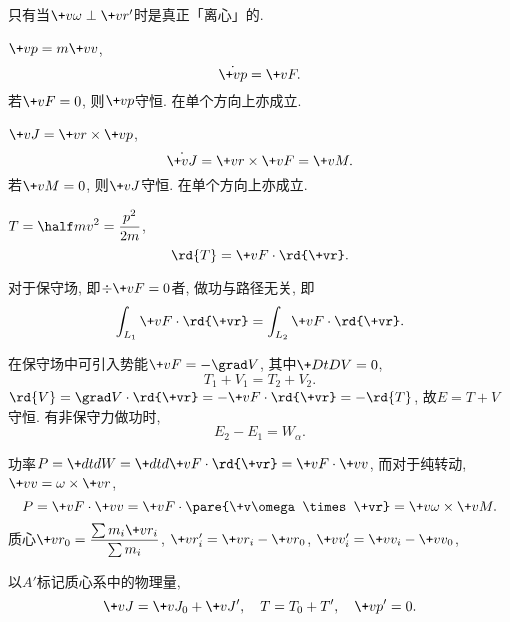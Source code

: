 \documentclass{ctexart}
\begin{document}
只有当$\+v\omega\perp\+vr'$时是真正「离心」的.
\begin{finale}
    \begin{theorem}[动量定理]
        $\+vp = m\+vv$,
        \[ \dot{\+vp} = \+vF. \]
        若$\+vF = 0$, 则$\+vp$守恒. 在单个方向上亦成立.
    \end{theorem}
    \begin{theorem}[角动量定理]
        $\+vJ = \+vr\times\+vp$,
        \[ \dot{\+vJ} = \+vr\times\+vF = \+vM. \]
        若$\+vM = 0$, 则$\+vJ$守恒. 在单个方向上亦成立.
    \end{theorem}
    \begin{theorem}[动能定理]
        $\displaystyle T = \half mv^2 = \frac{p^2}{2m}$,
        \[ \rd{T} = \+vF\cdot\rd{\+vr}. \]
    \end{theorem}
\end{finale}
\begin{figure}[ht]
    \centering
    \begin{subfigure}{.35\textwidth}
    \end{subfigure}
    \begin{subfigure}{.6\textwidth}
        \parbox{2.2in}{\begin{mtips}\vskip-\baselineskip
        \[ \dot{\+vp}\cdot\+vp = \half\+dtd{\+vp\cdot\+vp} = \half \+dtd{p^2}. \]\end{mtips}}
    \end{subfigure}
\end{figure}
\begin{theorem}[做功与路径无关]
    对于保守场, 即$\div\+vF = 0$者, 做功与路径无关, 即
    \[ \int_{L_1} \+vF\cdot\rd{\+vr} = \int_{L_2} \+vF\cdot\rd{\+vr}. \]
\end{theorem}
\begin{theorem}[机械能守恒]
    在保守场中可引入势能$\+vF = -\grad V$, 其中$\displaystyle \+DtDV = 0$,
    \[ T_1 + V_1 = T_2 + V_2. \]
    $\rd{V} = \grad V\cdot\rd{\+vr} = -\+vF\cdot\rd{\+vr} = -\rd{T}$, 故$E=T+V$守恒. 有非保守力做功时,
    \[ E_2 - E_1 = W_\alpha. \]
\end{theorem}
功率$\displaystyle P = \+dtdW = \+dtd{\+vF\cdot\rd{\+vr}} = \+vF\cdot\+vv$, 而对于纯转动, $\+vv = \omega\times\+vr$,
\[ P = \+vF\cdot\+vv = \+vF \cdot\pare{\+v\omega\times\+vr} = \+v\omega\times\+vM. \]
质心$\displaystyle \+vr_0 = \frac{\sum m_i\+vr_i}{\sum m_i}$, $\+vr'_i = \+vr_i - \+vr_0$, $\+vv'_i = \+vv_i - \+vv_0$,
\begin{theorem}[K\"onig定理]
    以$A'$标记质心系中的物理量,
    \[ \+vJ = \+vJ_0 + \+vJ',\quad T = T_0 + T',\quad \+vp' = 0. \]
\end{theorem}
\end{document}
